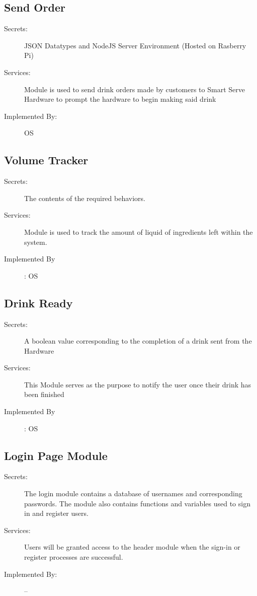 \documentclass[12pt, titlepage]{article}
\begin{document}
\subsection{Send Order}
\begin{description}
\item[Secrets:]JSON Datatypes and NodeJS Server Environment (Hosted on Rasberry Pi)
\item[Services:]Module is used to send drink orders made by customers to Smart Serve Hardware to prompt the hardware to begin making said drink
\item[Implemented By:]OS
\end{description}

\subsection{Volume Tracker}
\begin{description}
\item[Secrets:]The contents of the required behaviors.
\item[Services:]Module is used to track the amount of liquid of ingredients left within the system.
\item[Implemented By]: OS
 \end{description}

 \subsection{Drink Ready}
\begin{description}
\item[Secrets:]A boolean value corresponding to the completion of a drink sent from the Hardware
\item[Services:]This Module serves as the purpose to notify the user once their drink has been finished
\item[Implemented By]: OS
 \end{description}

\subsection{Login Page Module}

\begin{description}
\item[Secrets:] The login module contains a database of usernames and corresponding passwords. The module also contains functions and variables used to sign in and register users.
\item[Services:] Users will be granted access to the header module when the sign-in or register processes are successful.
\item[Implemented By:] --
\end{description}
\end{document}
